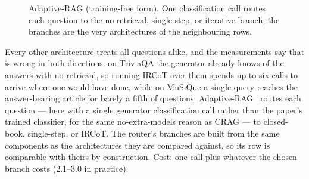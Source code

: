 \begin{figure}[t]
\centering
{}
\caption{Adaptive-RAG (training-free form). One classification call routes
each question to the no-retrieval, single-step, or iterative branch; the
branches are the very architectures of the neighbouring rows.}
\label{fig:arch-adaptive}
\end{figure}

Every other architecture treats all questions alike, and the measurements
say that is wrong in both directions: on TriviaQA the generator already
knows \ClosedBookTriviaQAEM{} of the answers with no retrieval, so running
IRCoT over them spends up to six calls to arrive where one would have
done, while on MuSiQue a single query reaches the answer-bearing article
for barely a fifth of questions. Adaptive-RAG~\citep{jeong2024adaptiverag}
routes each question --- here with a single generator classification call
rather than the paper's trained classifier, for the same
no-extra-models reason as CRAG --- to closed-book, single-step, or IRCoT.
The router's branches are built from the same components as the
architectures they are compared against, so its row is comparable with
theirs by construction. Cost: one call plus whatever the chosen branch
costs (2.1--3.0 in practice).

